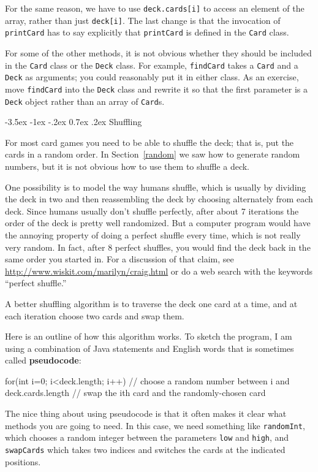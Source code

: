 \documentclass{book}
\makeatletter
\renewcommand{\section}{\@startsection 
    {section} {1} {0mm}%
    {-3.5ex \@plus -1ex \@minus -.2ex}%
    {0.7ex \@plus.2ex}%
    {\normalfont\Large\bfseries}}
\makeatother
\begin{document}
For the same reason, we have to use {\tt deck.cards[i]} to access an
element of the array, rather than just {\tt deck[i]}.  The last change
is that the invocation of {\tt printCard} has to say explicitly that
{\tt printCard} is defined in the {\tt Card} class.

For some of the other methods, it is not obvious whether they should
be included in the {\tt Card} class or the {\tt Deck} class.  For
example, {\tt findCard} takes a {\tt Card} and a {\tt Deck} as
arguments; you could reasonably put it in either class.  As an
exercise, move {\tt findCard} into the {\tt Deck} class and rewrite it
so that the first parameter is a {\tt Deck} object rather than an
array of {\tt Card}s.


\section{Shuffling}
\label{shuffle}

For most card games you need to be able to shuffle the deck;
that is, put the cards in a random order.  In Section~\ref{random}
we saw how to generate random numbers, but it is not obvious how
to use them to shuffle a deck.

One possibility is to model the way humans shuffle, which is usually
by dividing the deck in two and then reassembling the deck by choosing
alternately from each deck.  Since humans usually don't shuffle
perfectly, after about 7 iterations the order of the deck is pretty
well randomized.  But a computer program would have the annoying
property of doing a perfect shuffle every time, which is not really
very random.  In fact, after 8 perfect shuffles, you would find the
deck back in the same order you started in.  For a discussion of that
claim, see \url{http://www.wiskit.com/marilyn/craig.html} or do a web
search with the keywords ``perfect shuffle.''

A better shuffling algorithm is to traverse the deck one card at a
time, and at each iteration choose two cards and swap them.


Here is an outline of how this algorithm works.  To sketch the
program, I am using a combination of Java statements and English
words that is sometimes called {\bf pseudocode}:

\begin{verbatimtab}
    for(int i=0; i<deck.length; i++) {
        // choose a random number between i and deck.cards.length
        // swap the ith card and the randomly-chosen card
    }
\end{verbatimtab}
%
The nice thing about using pseudocode is that it often makes it
clear what methods you are going to need.  In this case, we
need something like {\tt randomInt}, which chooses a random
integer between the parameters {\tt low} and {\tt high},
and {\tt swapCards} which takes two indices and switches the
cards at the indicated positions.
\end{document}
